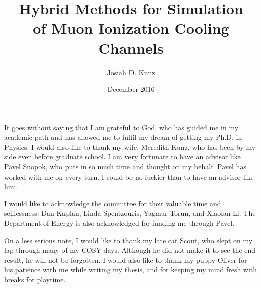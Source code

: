 \title{Hybrid Methods for Simulation\\
of Muon Ionization Cooling Channels}
\author{Josiah D. Kunz}
\date{December 2016}
\copyrightnoticefalse      %
\maketitle                %


\prelimpages         %


\begin{acknowledgement}

It goes without saying that I am grateful to God, who has guided me in my academic path and has allowed me to fulfil my dream of getting my Ph.D. in Physics. I would also like to thank my wife, Meredith Kunz, who has been by my side even before graduate school. I am very fortunate to have an advisor like Pavel Snopok, who puts in so much time and thought on my behalf. Pavel has worked with me on every turn. I could be no luckier than to have an advisor like him. 

I would like to acknowledge the committee for their valuable time and selflessness: Dan Kaplan, Linda Spentzouris, Yagmur Torun, and Xiaofan Li. The Department of Energy is also acknowledged for funding me through Pavel.

On a less serious note, I would like to thank my late cat Scout, who slept on my lap through many of my COSY days. Although he did not make it to see the end result, he will not be forgotten. I would also like to thank my puppy Oliver for his patience with me while writing my thesis, and for keeping my mind fresh with breaks for playtime.

\end{acknowledgement}


\tableofcontents
\clearpage

\listoftables

\clearpage

\listoffigures

\clearpage